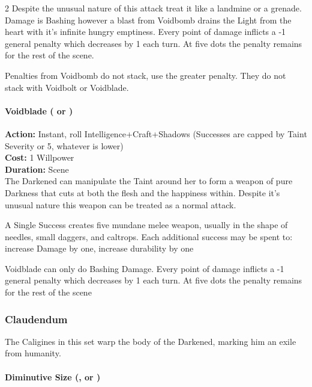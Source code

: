 \begin{multicols}{2}
Despite the unusual nature of this attack treat it like a landmine or a grenade. Damage is Bashing however a blast from Voidbomb drains the Light from the heart with it's infinite hungry emptiness. Every point of damage inflicts a -1 general penalty which decreases by 1 each turn. At five dots the penalty remains for the rest of the scene.

Penalties from Voidbomb do not stack, use the greater penalty. They do not stack with Voidbolt or Voidblade.\\

\paragraph*{Voidblade ( \textbullet\textbullet\textbullet or \textbullet\textbullet\textbullet\textbullet\textbullet)}

\noindent \textbf{Action:} Instant, roll Intelligence+Craft+Shadows (Successes are capped by Taint Severity or 5, whatever is lower)\\

\noindent \textbf{Cost:} 1 Willpower \\

\noindent \textbf{Duration:} Scene \\

\noindent The Darkened can manipulate the Taint around her to form a weapon of pure Darkness that cuts at both the flesh and the happiness within. Despite it's unusual nature this weapon can be treated as a normal attack.

A Single Success creates five mundane melee weapon, usually in the shape of needles, small daggers, and caltrops. Each additional success may be spent to: increase Damage by one, increase durability by one

Voidblade can only do Bashing Damage. Every point of damage inflicts a -1 general penalty which decreases by 1 each turn. At five dots the penalty remains for the rest of the scene\

\subsubsection*{Claudendum}

The Caligines in this set warp the body of the Darkened, marking him an exile from humanity. \\

\paragraph*{Diminutive Size (\textbullet, \textbullet\textbullet\textbullet or \textbullet\textbullet\textbullet\textbullet\textbullet)}


\end{multicols}
